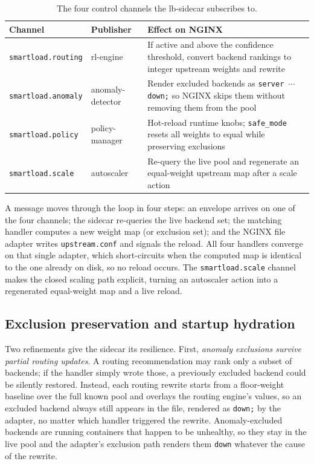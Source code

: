 \begin{table}[H]
\centering
\caption[The four control channels the lb-sidecar subscribes to]{The four control channels the lb-sidecar subscribes to.}
\label{tab:ima:channels}
\small
\begin{tabularx}{\linewidth}{@{}l l Y@{}}
\toprule
\textbf{Channel} & \textbf{Publisher} & \textbf{Effect on NGINX} \\
\midrule
\texttt{smartload.routing} & rl-engine & If active and above the confidence threshold, convert backend rankings to integer upstream weights and rewrite \\
\texttt{smartload.anomaly} & anomaly-detector & Render excluded backends as \texttt{server $\cdots$ down;} so NGINX skips them without removing them from the pool \\
\texttt{smartload.policy}  & policy-manager & Hot-reload runtime knobs; \texttt{safe\_mode} resets all weights to equal while preserving exclusions \\
\texttt{smartload.scale}   & autoscaler & Re-query the live pool and regenerate an equal-weight upstream map after a scale action \\
\bottomrule
\end{tabularx}
\end{table}

A message moves through the loop in four steps: an envelope arrives on one of the
four channels; the sidecar re-queries the live backend set; the matching handler
computes a new weight map (or exclusion set); and the NGINX file adapter writes
\texttt{upstream.conf} and signals the reload. All four handlers converge on that
single adapter, which short-circuits when the computed map is identical to the one
already on disk, so no reload occurs. The \texttt{smartload.scale} channel makes
the closed scaling path explicit, turning an autoscaler action into a regenerated
equal-weight map and a live reload.

\subsection{Exclusion preservation and startup hydration}
\label{sec:ima:exclusion}

Two refinements give the sidecar its resilience. First, \emph{anomaly exclusions
survive partial routing updates}. A routing recommendation may rank only a subset of
backends; if the handler simply wrote those, a previously excluded backend could be
silently restored. Instead, each routing rewrite starts from a floor-weight baseline
over the full known pool and overlays the routing engine's values, so an excluded
backend always still appears in the file, rendered as \texttt{down;} by the adapter,
no matter which handler triggered the rewrite. Anomaly-excluded backends are running
containers that happen to be unhealthy, so they stay in the live pool and the
adapter's exclusion path renders them \texttt{down} whatever the cause of the
rewrite.

